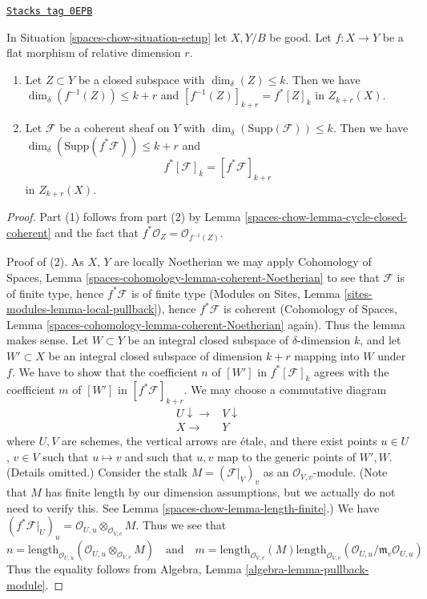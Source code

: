 \begin{lemma}
\label{spaces-chow-lemma-pullback-coherent}
\href{https://stacks.math.columbia.edu/tag/0EPB}{\texttt{Stacks tag 0EPB}}

In Situation \ref{spaces-chow-situation-setup} let $X, Y/B$ be good.
Let $f : X \to Y$ be a flat morphism of relative dimension $r$.
\begin{enumerate}
\item Let $Z \subset Y$ be a closed subspace with
$\dim_\delta(Z) \leq k$. Then we have
$\dim_\delta(f^{-1}(Z)) \leq k + r$
and $[f^{-1}(Z)]_{k + r} = f^*[Z]_k$ in $Z_{k + r}(X)$.
\item Let $\mathcal{F}$ be a coherent sheaf on $Y$ with
$\dim_\delta(\text{Supp}(\mathcal{F})) \leq k$.
Then we have $\dim_\delta(\text{Supp}(f^*\mathcal{F})) \leq k + r$
and
$$
f^*[{\mathcal F}]_k = [f^*{\mathcal F}]_{k+r}
$$
in $Z_{k + r}(X)$.
\end{enumerate}
\end{lemma}

\begin{proof}
Part (1) follows from part (2) by Lemma \ref{spaces-chow-lemma-cycle-closed-coherent}
and the fact that $f^*\mathcal{O}_Z = \mathcal{O}_{f^{-1}(Z)}$.

\medskip\noindent
Proof of (2).
As $X$, $Y$ are locally Noetherian we may apply
Cohomology of Spaces, Lemma \ref{spaces-cohomology-lemma-coherent-Noetherian}
to see
that $\mathcal{F}$ is of finite type, hence $f^*\mathcal{F}$ is
of finite type (Modules on Sites, Lemma
\ref{sites-modules-lemma-local-pullback}),
hence $f^*\mathcal{F}$ is coherent
(Cohomology of Spaces, Lemma \ref{spaces-cohomology-lemma-coherent-Noetherian}
again).
Thus the lemma makes sense. Let $W \subset Y$ be an integral closed
subspace of $\delta$-dimension $k$, and let $W' \subset X$ be
an integral closed subspace of dimension $k + r$ mapping into $W$
under $f$. We have to show that the coefficient $n$ of
$[W']$ in $f^*[{\mathcal F}]_k$ agrees with the coefficient
$m$ of $[W']$ in $[f^*{\mathcal F}]_{k+r}$. We may choose
a commutative diagram
$$
\begin{array}{cc}U \downarrow\longrightarrow & V \downarrow \\ X \longrightarrow & Y\end{array}
$$
where $U, V$ are schemes, the vertical arrows are \'etale, and
there exist points $u \in U$, $v \in V$ such that
$u \mapsto v$ and such that $u, v$ map to the generic
points of $W', W$. (Details omitted.)
Consider the stalk $M = (\mathcal{F}|_V)_v$ as an $\mathcal{O}_{V, v}$-module.
(Note that $M$ has finite length by our dimension assumptions, but we
actually do not need to verify this. See Lemma \ref{spaces-chow-lemma-length-finite}.)
We have
$(f^*\mathcal{F}|_U)_u = \mathcal{O}_{U, u} \otimes_{\mathcal{O}_{V, v}} M$.
Thus we see that
$$
n = \text{length}_{\mathcal{O}_{U, u}}
(\mathcal{O}_{U, u} \otimes_{\mathcal{O}_{V, v}} M)
\quad
\text{and}
\quad
m = \text{length}_{\mathcal{O}_{V, v}}(M)
\text{length}_{\mathcal{O}_{V, v}}(
\mathcal{O}_{U, u}/\mathfrak m_v \mathcal{O}_{U, u})
$$
Thus the equality follows from
Algebra, Lemma \ref{algebra-lemma-pullback-module}.
\end{proof}

